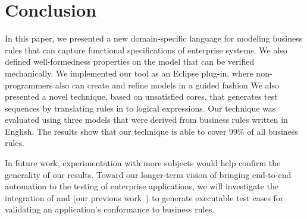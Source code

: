 \section{Conclusion}

In this paper, we presented a new domain-specific language for modeling business
rules that can capture functional specifications of enterprise systems. We also
defined well-formedness properties on the model that can be verified
mechanically. We implemented our tool as an Eclipse plug-in, where
non-programmers also can create and refine models in a guided fashion We also
presented a novel technique, based on unsatisfied cores, that generates test
sequences by translating rules in to logical expressions.
Our technique was evaluated using three models that were derived from business
rules written in English. The results show that our technique is able to cover
99\% of all business rules.

In future work, experimentation with more subjects would help confirm the
generality of our results.  Toward our longer-term vision of bringing end-to-end
automation to the testing of enterprise applications, we will investigate the
integration of \tool{} and \wateg{} (our previous
work~\cite{Thummalapenta:2013}) to generate executable test cases for validating
an application's conformance to business rules.

